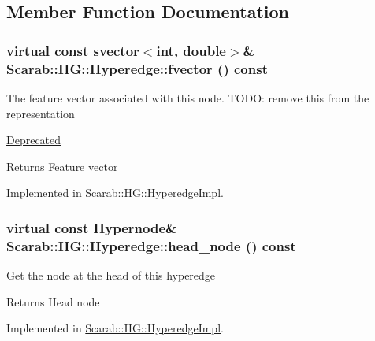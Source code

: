 \subsection{Member Function Documentation}
\hypertarget{class_scarab_1_1_h_g_1_1_hyperedge_a0d201ddb955631aadee4c15cc8e709f8}{
\subsubsection[{fvector}]{\setlength{\rightskip}{0pt plus 5cm}virtual const svector$<$int, double$>$\& Scarab::HG::Hyperedge::fvector () const}}
\label{class_scarab_1_1_h_g_1_1_hyperedge_a0d201ddb955631aadee4c15cc8e709f8}
The feature vector associated with this node. TODO: remove this from the representation \begin{Desc}
\item[\hyperlink{deprecated__deprecated000005}{Deprecated}]\end{Desc}
\begin{DoxyReturn}{Returns}
Feature vector 
\end{DoxyReturn}


Implemented in \hyperlink{class_scarab_1_1_h_g_1_1_hyperedge_impl_a359446c285164a93995bb87e6ea74882}{Scarab::HG::HyperedgeImpl}.

\hypertarget{class_scarab_1_1_h_g_1_1_hyperedge_a6043de341070c103d811f5286193dd46}{
\subsubsection[{head\_\-node}]{\setlength{\rightskip}{0pt plus 5cm}virtual const {\bf Hypernode}\& Scarab::HG::Hyperedge::head\_\-node () const}}
\label{class_scarab_1_1_h_g_1_1_hyperedge_a6043de341070c103d811f5286193dd46}
Get the node at the head of this hyperedge

\begin{DoxyReturn}{Returns}
Head node 
\end{DoxyReturn}


Implemented in \hyperlink{class_scarab_1_1_h_g_1_1_hyperedge_impl_ae194bfc8ecac2a12791fa36c1c2c62a7}{Scarab::HG::HyperedgeImpl}.

